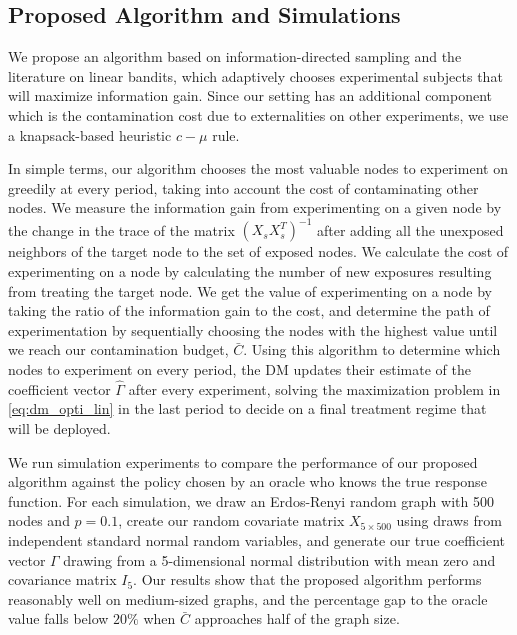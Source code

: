 \documentclass[11pt,a4paper]{article}
\begin{document}

\subsection{Proposed Algorithm and Simulations}

We propose an algorithm based on information-directed sampling and the literature on linear bandits, which adaptively chooses experimental subjects that will maximize information gain. Since our setting has an additional component which is the contamination cost due to externalities on other experiments, we use a knapsack-based heuristic $c-\mu$ rule.

In simple terms, our algorithm chooses the most valuable nodes to experiment on greedily at every period, taking into account the cost of contaminating other nodes. We measure the information gain from experimenting on a given node by the change in the trace of the matrix $( X_s X_s^T)^{-1}$ after adding all the unexposed neighbors of the target node to the set of exposed nodes. We calculate the cost of experimenting on a node by calculating the number of new exposures resulting from treating the target node. We get the value of experimenting on a node by taking the ratio of the information gain to the cost, and determine the path of experimentation by sequentially choosing the nodes with the highest value until we reach our contamination budget, $\bar{C}$. Using this algorithm to determine which nodes to experiment on every period, the DM updates their estimate of the coefficient vector $\hat \Gamma$ after every experiment, solving the maximization problem in \eqref{eq:dm_opti_lin} in the last period to decide on a final treatment regime that will be deployed.

We run simulation experiments to compare the performance of our proposed algorithm against the policy chosen by an oracle who knows the true response function. For each simulation, we draw an Erdos-Renyi random graph with 500 nodes and $p =0.1$, create our random covariate matrix $X_{5 \times 500}$ using draws from independent standard normal random variables, and generate our true coefficient vector $\Gamma$ drawing from a 5-dimensional normal distribution with mean zero and covariance matrix $I_5$. Our results show that the proposed algorithm performs reasonably well on medium-sized graphs, and the percentage gap to the oracle value falls below $20 \%$ when $\bar{C}$ approaches half of the graph size.
\end{document}
